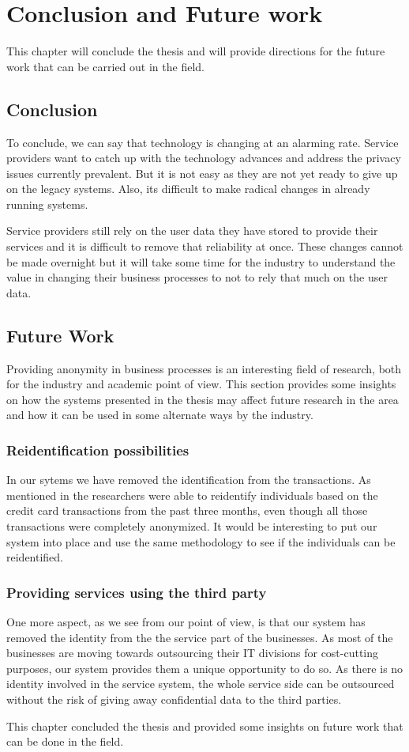 \chapter{Conclusion and Future work}
This chapter will conclude the thesis and will provide directions for the future work that can be carried out in the field.
\section{Conclusion}
To conclude, we can say that technology is changing at an alarming rate. Service providers want to catch up with the technology advances and address the privacy issues currently prevalent. But it is not easy as they are not yet ready to give up on the legacy systems. Also, its difficult to make radical changes in already running systems. 

Service providers still rely on the user data they have stored to provide their services and it is difficult to remove that reliability at once. These changes cannot be made overnight but it will take some time for the industry to understand the value in changing their business processes to not to rely that much on the user data. 
\section{Future Work}
Providing anonymity in business processes is an interesting field of research, both for the industry and academic point of view. This section provides some insights on how the systems presented in the thesis may affect future research in the area and how it can be used in some alternate ways by the industry.
\subsection{Reidentification possibilities}
In our sytems we have removed the identification from the transactions. As mentioned in \cite{de2015unique} the researchers were able to reidentify individuals based on the credit card transactions from the past three months, even though all those transactions were completely anonymized. It would be interesting to put our system into place and use the same methodology to see if the individuals can be reidentified.
\subsection{Providing services using the third party}
One more aspect, as we see from our point of view, is that our system has removed the identity from the the service part of the businesses. As most of the businesses are moving towards outsourcing their IT divisions for cost-cutting purposes, our system provides them a unique opportunity to do so. As there is no identity involved in the service system, the whole service side can be outsourced without the risk of giving away confidential data to the third parties.

This chapter concluded the thesis and provided some insights on future work that can be done in the field.

